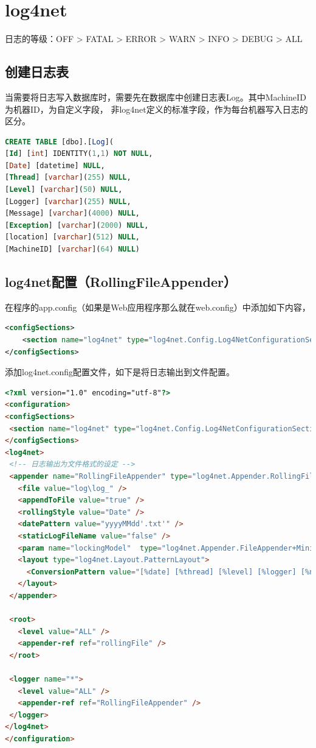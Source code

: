 \documentclass{book}
\begin{document}
\clearpage

\section{log4net}

日志的等级：OFF > FATAL > ERROR > WARN > INFO > DEBUG  > ALL

\subsection{创建日志表}

当需要将日志写入数据库时，需要先在数据库中创建日志表Log。其中MachineID为机器ID，为自定义字段，
非log4net定义的标准字段，作为每台机器写入日志的区分。

\begin{lstlisting}[language=SQL]
CREATE TABLE [dbo].[Log](	
[Id] [int] IDENTITY(1,1) NOT NULL,
[Date] [datetime] NULL,
[Thread] [varchar](255) NULL,	
[Level] [varchar](50) NULL,	
[Logger] [varchar](255) NULL,
[Message] [varchar](4000) NULL,	
[Exception] [varchar](2000) NULL,	
[location] [varchar](512) NULL,
[MachineID] [varchar](64) NULL)
\end{lstlisting}

\subsection{log4net配置（RollingFileAppender）}

在程序的app.config（如果是Web应用程序那么就在web.config）中添加如下内容，

\begin{lstlisting}[language=XML]
<configSections>    
	<section name="log4net" type="log4net.Config.Log4NetConfigurationSectionHandler, log4net"/>
</configSections>
\end{lstlisting}

添加log4net.config配置文件，如下是将日志输出到文件配置。

\begin{lstlisting}[language=HTML]
<?xml version="1.0" encoding="utf-8"?>
<configuration>
<configSections>
 <section name="log4net" type="log4net.Config.Log4NetConfigurationSectionHandler, log4net"/>
</configSections>
<log4net>
 <!-- 日志输出为文件格式的设定 -->
 <appender name="RollingFileAppender" type="log4net.Appender.RollingFileAppender">
   <file value="log\log_" />
   <appendToFile value="true" />
   <rollingStyle value="Date" />
   <datePattern value="yyyyMMdd'.txt'" />
   <staticLogFileName value="false" />
   <param name="lockingModel"  type="log4net.Appender.FileAppender+MinimalLock" />
   <layout type="log4net.Layout.PatternLayout">
     <ConversionPattern value="[%date] [%thread] [%level] [%logger] [%ndc] - %message%newline" />
   </layout>
 </appender>
 
 <root>
   <level value="ALL" />
   <appender-ref ref="rollingFile" />
 </root>

 <logger name="*">
   <level value="ALL" />
   <appender-ref ref="RollingFileAppender" />
 </logger>
</log4net>
</configuration>	
\end{lstlisting}
\end{document}
